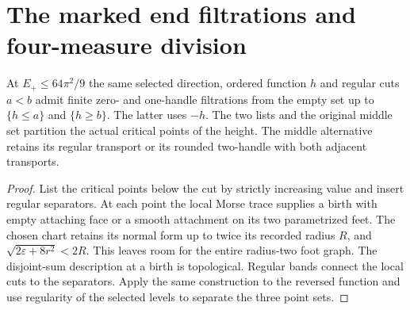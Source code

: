 \section{The marked end filtrations and four-measure division}
\label{sec:ed03-end-bands-division}

\begin{theorem}
\label{thm:ed03-end-filtrations}
\leanok
At $E_+\le64\pi^2/9$ the same selected direction, ordered function $h$
and regular cuts $a<b$ admit finite zero- and one-handle filtrations from
the empty set up to $\{h\le a\}$ and $\{h\ge b\}$. The latter uses $-h$.
The two lists and the original middle set partition the actual critical
points of the height. The middle alternative retains its regular transport
or its rounded two-handle with both adjacent transports.
\end{theorem}
\begin{proof}
\leanok
List the critical points below the cut by strictly increasing value and
insert regular separators. At each point the local Morse trace supplies
a birth with empty attaching face or a smooth attachment on its two
parametrized feet. The chosen chart retains its normal form up to twice
its recorded radius $R$, and $\sqrt{2\varepsilon+8r^2}<2R$. This
leaves room for the entire radius-two foot graph. The disjoint-sum description at a birth is topological.
Regular bands connect the local cuts to the separators. Apply the same
construction to the reversed function and use regularity of the selected
levels to separate the three point sets.
\end{proof}

